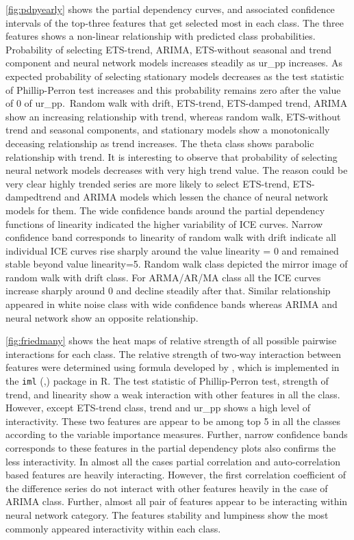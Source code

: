 \documentclass[11pt,a4paper,]{article}
\begin{document}
\autoref{fig:pdpyearly} shows the partial dependency curves, and
associated confidence intervals of the top-three features that get
selected most in each class. The three features shows a non-linear
relationship with predicted class probabilities. Probability of
selecting ETS-trend, ARIMA, ETS-without seasonal and trend component and
neural network models increases steadily as ur\_pp increases. As
expected probability of selecting stationary models decreases as the
test statistic of Phillip-Perron test increases and this probability
remains zero after the value of 0 of ur\_pp.~Random walk with drift,
ETS-trend, ETS-damped trend, ARIMA show an increasing relationship with
trend, whereas random walk, ETS-without trend and seasonal components,
and stationary models show a monotonically deceasing relationship as
trend increases. The theta class shows parabolic relationship with
trend. It is interesting to observe that probability of selecting neural
network models decreases with very high trend value. The reason could be
very clear highly trended series are more likely to select ETS-trend,
ETS-dampedtrend and ARIMA models which lessen the chance of neural
network models for them. The wide confidence bands around the partial
dependency functions of linearity indicated the higher variability of
ICE curves. Narrow confidence band corresponds to linearity of random
walk with drift indicate all individual ICE curves rise sharply around
the value linearity = 0 and remained stable beyond value linearity=5.
Random walk class depicted the mirror image of random walk with drift
class. For ARMA/AR/MA class all the ICE curves increase sharply around 0
and decline steadily after that. Similar relationship appeared in white
noise class with wide confidence bands whereas ARIMA and neural network
show an opposite relationship.

\autoref{fig:friedmany} shows the heat maps of relative strength of all
possible pairwise interactions for each class. The relative strength of
two-way interaction between features were determined using formula
developed by \textcite{friedman2008predictive}, which is implemented in
the \texttt{iml} (\textcite{molnar2018iml},) package in R. The test
statistic of Phillip-Perron test, strength of trend, and linearity show
a weak interaction with other features in all the class. However, except
ETS-trend class, trend and ur\_pp shows a high level of interactivity.
These two features are appear to be among top 5 in all the classes
according to the variable importance measures. Further, narrow
confidence bands corresponds to these features in the partial dependency
plots also confirms the less interactivity. In almost all the cases
partial correlation and auto-correlation based features are heavily
interacting. However, the first correlation coefficient of the
difference series do not interact with other features heavily in the
case of ARIMA class. Further, almost all pair of features appear to be
interacting within neural network category. The features stability and
lumpiness show the most commonly appeared interactivity within each
class.
\end{document}
